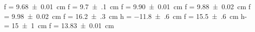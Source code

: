 f = \SI{+9.68(1)}{\centi\meter}
f = \SI{+9.7(1)}{\centi\meter}
f = \SI{+9.90(1)}{\centi\meter}
f = \SI{+9.88(2)}{\centi\meter}
f = \SI{+9.98(2)}{\centi\meter}
f = \SI{+16.2(3)}{\centi\meter}
h = \SI{-11.8(6)}{\centi\meter}
f = \SI{+15.5(6)}{\centi\meter}
h- = \SI{+15(1)}{\centi\meter}
f = \SI{+13.83(1)}{\centi\meter}
